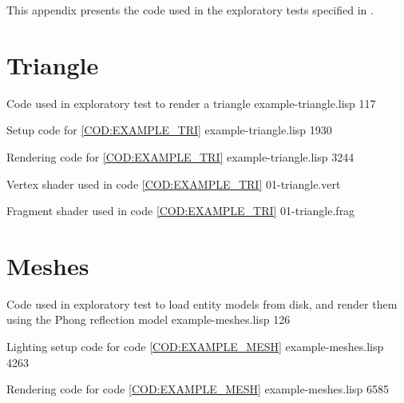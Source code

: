 \label{APP:EXAMPLES}

This appendix presents the code used in the exploratory tests specified in .

\section{Triangle}

\label{APP:TRIANGLE}

         {Code used in exploratory test to render a triangle}
         {example-triangle.lisp}
         {1}{17}{}

         {Setup code for \ref{COD:EXAMPLE_TRI}}
         {example-triangle.lisp}
         {19}{30}{}

         {Rendering code for \ref{COD:EXAMPLE_TRI}}
         {example-triangle.lisp}
         {32}{44}{}

      {Vertex shader used in code \ref{COD:EXAMPLE_TRI}}
      {01-triangle.vert}
      {}{}{}
         
      {Fragment shader used in code \ref{COD:EXAMPLE_TRI}}
      {01-triangle.frag}
      {}{}{}
         
\clearpage
\section{Meshes}

\label{APP:MESHES}

         {Code used in exploratory test to load entity models from disk,
           and render them using the Phong reflection model}
         {example-meshes.lisp}
         {1}{26}{}

         {Lighting setup code for code \ref{COD:EXAMPLE_MESH}}
         {example-meshes.lisp}
         {42}{63}{}

         {Rendering code for code \ref{COD:EXAMPLE_MESH}}
         {example-meshes.lisp}
         {65}{85}{}

